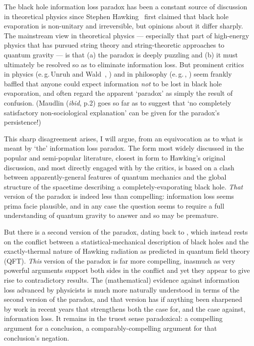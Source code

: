 \documentclass{article}
\newcommand{\egc}{\mbox{e.\,g.\,}}
\begin{document}
The black hole information loss paradox has been a constant source of discussion in theoretical physics since Stephen Hawking~\citeyear{hawkingbreakdown} first claimed that black hole evaporation is non-unitary and irreversible, but opinions about it differ sharply. The mainstream view in theoretical physics --- especially that part of high-energy physics that has pursued string theory and string-theoretic approaches to quantum gravity --- is that (a) the paradox is deeply puzzling and (b) it must ultimately be resolved so as to eliminate information loss. But prominent critics in physics (\egc Unruh and Wald~\citeyear{unruhwaldpuremixed,unruhwaldinformation}, ) and in philosophy (\egc {}, ) seem frankly baffled that anyone could expect information \emph{not} to be lost in black hole evaporation, and often regard the apparent `paradox' as simply the result of confusion. (Maudlin (\emph{ibid}, p.2) goes so far as to suggest that `no completely satisfactory non-sociological explanation' can be given for the paradox's persistence!)

This sharp disagreement arises, I will argue, from an equivocation as to what is meant by `the' information loss paradox. The form most widely discussed in the popular and semi-popular literature, closest in form to Hawking's original discussion, and most directly engaged with by the critics, is based on a clash between apparently-general features of quantum mechanics and the global structure of the spacetime describing a completely-evaporating black hole. \emph{That} version of the paradox is indeed less than compelling: information loss seems prima facie plausible, and in any case the question seems to require a full understanding of quantum gravity to answer and so may be premature.

But there is a second version of the paradox, dating back to , which instead rests on the conflict between a statistical-mechanical description of black holes and the exactly-thermal nature of Hawking radiation as predicted in quantum field theory (QFT). \emph{This} version of the paradox is far more compelling, inasmuch as very powerful arguments support both sides in the conflict and yet they appear to give rise to contradictory results. The (mathematical) evidence against information loss advanced by physicists is much more naturally understood in terms of the second version of the paradox, and that version has if anything been sharpened by work in recent years that strengthens both the case for, and the case against, information loss. It remains in the truest sense paradoxical: a compelling argument for a conclusion, a comparably-compelling argument for that conclusion's negation.
\end{document}
